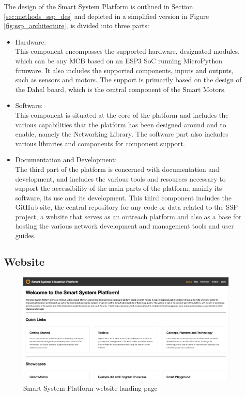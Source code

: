 The design of the Smart System Platform is outlined in Section \ref{sec:methods_ssp_des} and depicted in a simplified version in Figure \ref{fig:ssp_architecture}, is divided into three parts:
\begin{itemize}
    \item Hardware:\\
    This component encompasses the supported hardware, designated modules, which can be any MCB based on an ESP3 SoC running MicroPython firmware. It also includes the supported components, inputs and outputs, such as sensors and motors. The support is primarily based on the design of the Dahal board, which is the central component of the Smart Motors. 
    \item Software:\\
    This component is situated at the core of the platform and includes the various capabilities that the platform has been designed around and to enable, namely the Networking Library. The software part also includes various libraries and components for component support. 
    \item Documentation and Development:\\
    The third part of the platform is concerned with documentation and development, and includes the various tools and resources necessary to support the accessibility of the main parts of the platform, mainly its software, its use and its development. This third component includes the GitHub site, the central repository for any code or data related to the SSP project, a website that serves as an outreach platform and also as a base for hosting the various network development and management tools and user guides.
\end{itemize}

\subsection{\label{sec:res_website}Website}

\begin{figure}[H]
    \centering
    \includegraphics[width=\linewidth]{overleaf/images/website_landing_page.png}
    \vspace{\ftspace}
    \caption{Smart System Platform website landing page}
    \vspace{\ftspace}
    \label{fig:website_landing}
\end{figure}

